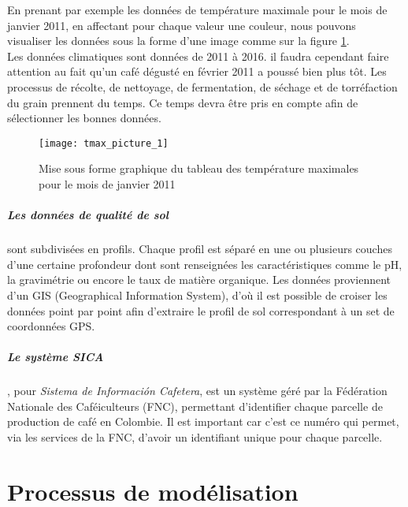 En prenant par exemple les données de température maximale pour le mois de janvier 2011, en affectant pour chaque valeur une couleur, nous pouvons visualiser les données sous la forme d'une image comme sur la figure \ref{tmax_picture}.\\

Les données climatiques sont données de 2011 à 2016. il faudra cependant faire attention au fait qu'un café dégusté en février 2011 a poussé bien plus tôt. Les processus de récolte, de nettoyage, de fermentation, de séchage et de torréfaction du grain prennent du temps. Ce temps devra être pris en compte afin de sélectionner les bonnes données. 


\begin{figure}[H]
	\texttt{[image: tmax\_picture\_1]}
	\caption{\label{tmax_picture} Mise sous forme graphique du tableau des température maximales pour le mois de janvier 2011 }
\end{figure}

\paragraph{Les données de qualité de sol}sont subdivisées en profils. Chaque profil est séparé en une ou plusieurs couches d’une certaine profondeur dont sont renseignées les caractéristiques comme le pH, la gravimétrie ou encore le taux de matière organique. Les données proviennent d'un GIS (Geographical Information System), d'où il est possible de croiser les données point par point afin d'extraire le profil de sol correspondant à un set de coordonnées GPS. 

\paragraph{Le système SICA}, pour \textit{Sistema de Información Cafetera}, est un système géré par la Fédération Nationale des Caféiculteurs (FNC), permettant d'identifier chaque parcelle de production de café en Colombie\cite{SICA}. Il est important car c'est ce numéro qui permet, via les services de la FNC, d'avoir un identifiant unique pour chaque parcelle.  


\chapter{Processus de modélisation}
